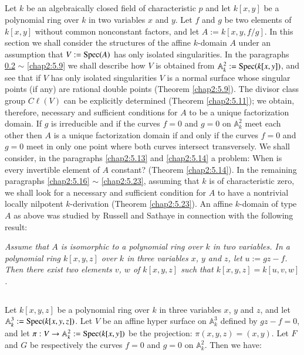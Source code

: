 \subsection{}\label{chap2:5.1}
Let $k$ be an algebraically closed field of characteristic $p$ and let
$k[x,y]$ be a polynomial ring over $k$ in two variables $x$ and
$y$. Let $f$ and $g$ be two elements of $k[x,y]$ without common
nonconstant factors, and let $A:=k[x,y,f/g]$. In this section we shall
consider the structures of the affine $k$-domain $A$ under an
assumption that $V:=\operatorname{Spec}(A)$ has only isolated singularities. In the
paragraphs \ref{chap2:5.2} $\sim$ \ref{chap2:5.9} we shall describe how $V$ is
obtained from $\mathbb{A}^{2}_{k}:=\operatorname{Spec}(k[x,y])$, and see that if $V$
has only isolated singularities $V$ is a normal surface whose singular
points (if any) are rational double points (\cf Theorem
\ref{chap2:5.9}). The divisor class group $C\ell(V)$ can be explicitly
determined (\cf Theorem \ref{chap2:5.11}); we obtain, therefore,
necessary and sufficient conditions for $A$ to be a unique
factorization domain. If $g$ is irreducible and if the curves $f=0$
and $g=0$ on $\mathbb{A}^{2}_{k}$ meet each other then $A$ is a unique
factorization domain if and only if the curves $f=0$ and $g=0$ meet in
only one point where both curves intersect transversely. We shall
consider, in the paragraphs \ref{chap2:5.13} and \ref{chap2:5.14} a problem: When
is every invertible element of $A$ constant? (\cf Theorem
\ref{chap2:5.14}). In the remaining paragraphs \ref{chap2:5.16} $\sim$
\ref{chap2:5.23}, assuming that $k$ is of characteristic zero, we shall look
for a necessary and sufficient condition for $A$ to have a nontrivial
locally nilpotent $k$-derivation (\cf Theorem \ref{chap2:5.23}). An
affine $k$-domain of type $A$ as above was studied by Russell
\cite{49} and Sathaye \cite{52} in connection with the following
result:\pageoriginale\ 

{\em Assume that $A$ is isomorphic to a polynomial ring over $k$ in
  two variables. In a polynomial ring $k[x,y,z]$ over $k$ in three
  variables $x$, $y$ and $z$, let $u:=gz-f$. Then there exist two
  elements $v$, $w$ of $k[x,y,z]$ such that $k[x,y,z]=k[u,v,w]$.}

\subsection{}\label{chap2:5.2}
Let $k[x,y,z]$ be a polynomial ring over $k$ in three variables $x$,
$y$ and $z$, and let $\mathbb{A}^{3}_{k}:=\operatorname{Spec}(k[x,y,z])$. Let $V$ be
an affine hyper surface on $\mathbb{A}^{3}_{k}$ defined by $gz-f=0$,
and let $\pi:V\to \mathbb{A}^{2}_{k}:=\operatorname{Spec}(k[x,y])$ be the
projection: $\pi(x,y,z)=(x,y)$. Let $F$ and $G$ be respectively the
curves $f=0$ and $g=0$ on $\mathbb{A}^{2}_{k}$. Then we have:

